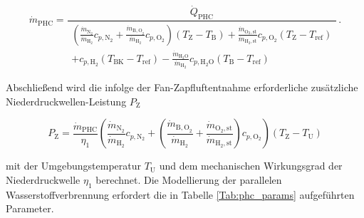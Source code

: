 \begin{equation}\label{Eq:phc}
	\dot{m}_{\mathrm{PHC}}=\frac{\dot{Q}_{\mathrm{PHC}}}{
    \begin{aligned}
    \left(\frac{\dot{m}_{\mathrm{N}_2}}{\dot{m}_{\mathrm{H}_2}}c_{p,\mathrm{N}_2}+\frac{\dot{m}_{\mathrm{B,O}_2}}{\dot{m}_{\mathrm{H}_2}}c_{p,\mathrm{O}_2}\right)(T_\mathrm{Z}-T_\mathrm{B})+\frac{\dot{m}_{\mathrm{O}_2,\mathrm{st}}}{\dot{m}_{\mathrm{H}_2,\mathrm{st}}}c_{p,\mathrm{O}_2}(T_\mathrm{Z}-T_{\mathrm{ref}})\\
    +c_{p,\mathrm{H}_2}(T_{\mathrm{BK}}-T_{\mathrm{ref}})-\frac{\dot{m}_{\mathrm{H}_2\mathrm{O}}}{\dot{m}_{\mathrm{H}_2}}c_{p,\mathrm{H}_2\mathrm{O}}(T_\mathrm{B}-T_{\mathrm{ref}})
    \end{aligned}
    }\,.
\end{equation}

Abschließend wird die infolge der Fan-Zapfluftentnahme erforderliche zusätzliche Niederdruckwellen-Leistung $P_\mathrm{Z}$

\begin{equation}\label{Eq:fanpower}
	P_\mathrm{Z} = \frac{\dot{m}_{\mathrm{PHC}}}{\eta_1}\left(\frac{\dot{m}_\mathrm{{N}_2}}{\dot{m}_{\mathrm{H}_2}}c_{p,\mathrm{N}_2}+\left(\frac{\dot{m}_{\mathrm{B,O}_2}}{\dot{m}_{\mathrm{H}_2}}+\frac{\dot{m}_{\mathrm{O}_2,\mathrm{st}}}{\dot{m}_{\mathrm{H}_2,\mathrm{st}}}\right)c_{p,\mathrm{O}_2}\right)(T_\mathrm{Z}-T_\mathrm{U})
\end{equation}

mit der Umgebungstemperatur $T_\mathrm{U}$ und dem mechanischen Wirkungsgrad der Niederdruckwelle $\eta_1$ berechnet. Die Modellierung der parallelen Wasserstoffverbrennung erfordert die in Tabelle \ref{Tab:phc_params} aufgeführten Parameter.


